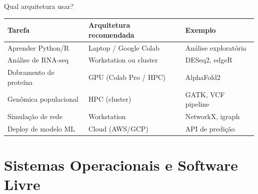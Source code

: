 \begin{frame}{Qual arquitetura usar?}
\begin{center}
\begin{tabular}{lll}
\toprule
\textbf{Tarefa} & \textbf{Arquitetura recomendada} & \textbf{Exemplo} \\
\midrule
Aprender Python/R & Laptop / Google Colab & Análise exploratória \\
Análise de RNA-seq & Workstation ou cluster & DESeq2, edgeR \\
Dobramento de proteína & GPU (Colab Pro / HPC) & AlphaFold2 \\
Genômica populacional & HPC (cluster) & GATK, VCF pipeline \\
Simulação de rede & Workstation & NetworkX, igraph \\
Deploy de modelo ML & Cloud (AWS/GCP) & API de predição \\
\bottomrule
\end{tabular}
\end{center}

\vspace{0.2cm}
\end{frame}

\section{Sistemas Operacionais e Software Livre}

